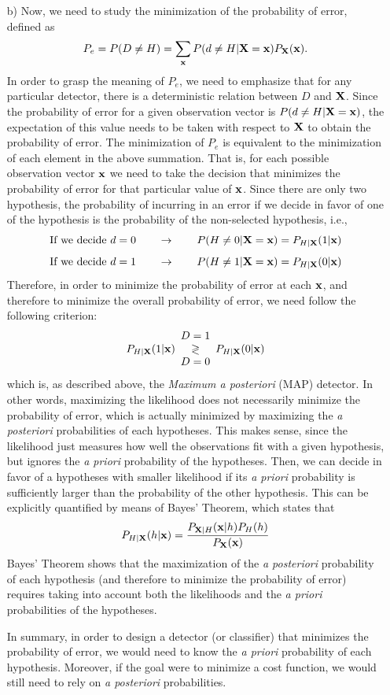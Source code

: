 \begin{solution}
\begin{itemize}
		\item[b)] Now, we need to study the minimization of the probability of error, defined as
		$$P_e = P(D\neq H) = \sum_{\bf x} P(d\neq H | {\bf X}={\bf x}) P_{\bf X}({\bf x}).$$
		In order to grasp the meaning of $P_e$, we need to emphasize that for any particular detector, there is a deterministic relation between $D$ and ${\bf X}$. Since the probability of error for a given observation vector is $P(d\neq H | {\bf X}={\bf x})$, the expectation of this value needs to be taken with respect to ${\bf X}$ to obtain the probability of error. The minimization of $P_e$ is equivalent to the minimization of each element in the above summation. That is, for each possible observation vector ${\bf x}$ we need to take the decision that minimizes the probability of error for that particular value of ${\bf x}$. Since there are only two hypothesis, the probability of incurring in an error if we decide in favor of one of the hypothesis is the probability of the non-selected hypothesis, i.e.,
		$$\text{If we decide } d=0 \qquad \rightarrow \qquad  P(H \neq 0 | {\bf X}={\bf x}) = P_{H|{\bf X}}(1|{\bf x})$$
		$$\text{If we decide } d=1 \qquad \rightarrow \qquad  P(H\neq 1 | {\bf X}={\bf x}) = P_{H|{\bf X}}(0|{\bf x})$$
		Therefore, in order to minimize the probability of error at each ${\bf x}$, and therefore to minimize the overall probability of error, we need follow the following criterion:
		$$P_{H|{\bf X}}(1|{\bf x}) \begin{array}{c} D=1 \\ \gtrless \\ D=0 \end{array} P_{H|{\bf X}}(0|{\bf x})$$
		which is, as described above, the {\em Maximum a posteriori} (MAP) detector. In other words, maximizing the likelihood does not necessarily minimize the probability of error, which is actually minimized by maximizing the {\em a posteriori} probabilities of each hypotheses. This makes sense, since the likelihood just measures how well the observations fit with a given hypothesis, but ignores the {\em a priori} probability of the hypotheses. Then, we can  decide in favor of a hypotheses with smaller likelihood if its {\em a priori} probability is sufficiently larger than the probability of the other hypothesis. This can be explicitly quantified by means of Bayes' Theorem, which states that
		$$P_{H|{\bf X}}(h|{\bf x}) = \frac{P_{{\bf X}|H}({\bf x}|h) P_{H}(h)}{P_{\bf X}({\bf x})}$$
		Bayes' Theorem shows that the maximization of  the {\em a posteriori} probability of each hypothesis (and therefore to minimize the probability of error) requires taking into account both the likelihoods and the {\em a priori} probabilities of the hypotheses.
		
		In summary, in order to design a detector (or classifier) that minimizes the probability of error, we would need to know the {\em a priori} probability of each hypothesis. Moreover, if the goal were to minimize a cost function, we would still need to rely on {\em a posteriori} probabilities.
		
	\end{itemize}
	
\end{solution}

